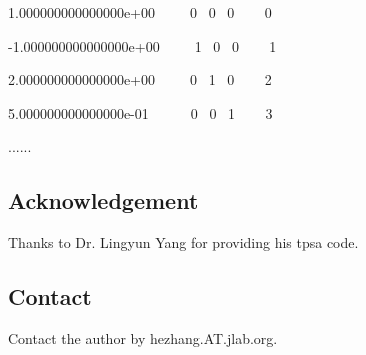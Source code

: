 1.\+000000000000000e+00      0  0  0     0 

-\/1.\+000000000000000e+00      1  0  0     1   

2.\+000000000000000e+00      0  1  0     2   

5.\+000000000000000e-\/01       0  0  1     3

......

\subsection*{Acknowledgement}

Thanks to Dr. Lingyun Yang for providing his tpsa code.

\subsection*{Contact}

Contact the author by hezhang.\+A\+T.\+jlab.\+org. 